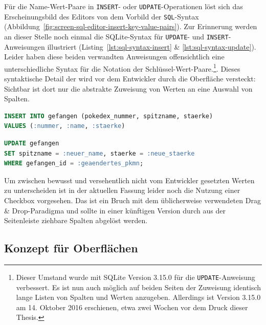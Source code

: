 Für die Name-Wert-Paare in \texttt{INSERT}- oder \texttt{UDPATE}-Operationen löst sich das Erscheinungsbild des Editors von dem Vorbild der \texttt{SQL}-Syntax (Abbildung~\ref{fig:screen-sql-editor-insert-key-value-pairs}). Zur Erinnerung werden an dieser Stelle noch einmal die SQLite-Syntax für \texttt{UPDATE}- und \texttt{INSERT}-Anweisungen illustriert (Listing~\ref{lst:sql-syntax-insert} \& \ref{lst:sql-syntax-update}). Leider haben diese beiden verwandten Anweisungen offensichtlich eine unterschiedliche Syntax für die Notation der Schlüssel-Wert-Paare.\footnote{Dieser Umstand wurde mit SQLite Version 3.15.0 für die \texttt{UPDATE}-Anweisung verbessert. Es ist nun auch möglich auf beiden Seiten der Zuweisung identisch lange Listen von Spalten und Werten anzugeben. Allerdings ist Version 3.15.0 am 14. Oktober 2016 erschienen, etwa zwei Wochen vor dem Druck dieser Thesis.}. Dieses syntaktische Detail der wird vor dem Entwickler durch die Oberfläche versteckt: Sichtbar ist dort nur die abstrakte Zuweisung von Werten an eine Auswahl von Spalten.

\begin{lstlisting}[language=SQL,float=h!,caption={Syntax einer \texttt{INSERT}-Anweisung}, label={lst:sql-syntax-insert}]
INSERT INTO gefangen (pokedex_nummer, spitzname, staerke)
VALUES (:nummer, :name, :staerke)
\end{lstlisting}

\begin{lstlisting}[language=SQL,float=h!,caption={Syntax einer \texttt{UPDATE}-Anweisung}, label={lst:sql-syntax-update}]
UPDATE gefangen
SET spitzname = :neuer_name, staerke = :neue_staerke
WHERE gefangen_id = :geaendertes_pkmn;
\end{lstlisting}

Um zwischen bewusst und versehentlich nicht vom Entwickler gesetzten Werten zu unterscheiden ist in der aktuellen Fassung leider noch die Nutzung einer Checkbox vorgesehen. Das ist ein Bruch mit dem üblicherweise verwendeten Drag \& Drop-Paradigma und sollte in einer künftigen Version durch aus der Seitenleiste ziehbare Spalten abgelöst werden.

\subsection{Konzept für Oberflächen}
\label{sec:design-ui-concept}


